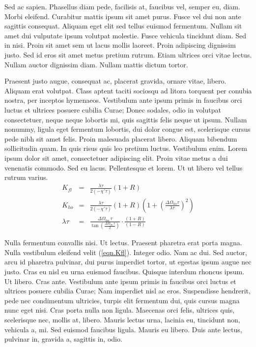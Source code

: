 \documentclass[article,colorback,accentcolor=tud4c]{tudreport}
\newif\ifTUDmargin\TUDmarginfalse
\begin{document}
    Sed ac sapien. Phasellus diam pede, facilisis at, faucibus vel, semper eu, diam. Morbi eleifend. Curabitur mattis ipsum sit amet purus. Fusce vel dui non ante sagittis consequat. Aliquam eget elit sed tellus euismod fermentum. Nullam sit amet dui vulputate ipsum volutpat molestie. Fusce vehicula tincidunt diam. Sed in nisi. Proin sit amet sem ut lacus mollis laoreet. Proin adipiscing dignissim justo. Sed id eros sit amet metus pretium rutrum. Etiam ultrices orci vitae lectus. Nullam auctor dignissim diam. Nullam mattis dictum tortor.

    Praesent justo augue, consequat ac, placerat gravida, ornare vitae, libero. Aliquam erat volutpat. Class aptent taciti sociosqu ad litora torquent per conubia nostra, per inceptos hymenaeos. Vestibulum ante ipsum primis in faucibus orci luctus et ultrices posuere cubilia Curae; Donec sodales, odio in volutpat consectetuer, neque neque lobortis mi, quis sagittis felis neque ut ipsum. Nullam nonummy, ligula eget fermentum lobortis, dui dolor congue est, scelerisque cursus pede nibh sit amet felis. Proin malesuada placerat libero. Aliquam bibendum sollicitudin quam. In quis risus quis leo pretium luctus. Vestibulum enim. Lorem ipsum dolor sit amet, consectetuer adipiscing elit. Proin vitae metus a dui venenatis commodo. Sed eu lacus. Pellentesque et lorem. Ut ut libero vel tellus rutrum varius.
			\begin{eqnarray}
				K_{fl}&=&\frac{\lambda\tau}{2(-\chi'\tau)}(1+R)\label{eqn.Kfl}\\
				K_{ho}&=&\frac{\lambda\tau}{2(-\chi'\tau)}(1+R)
					\left(1+\left(\frac{\Delta\Omega_{ho}\tau}{\lambda\tau}\right)^2\right)
					\label{eqn.Kho}\\
				\lambda\tau&=&
					\frac{\Delta\Omega_{ho}\,\tau}{\tan\left(\frac{\Delta\Omega_{ho}\,\tau}{2}
					\right)}\cdot\frac{(1+R)}{(1-R)}\label{eqn.lambda}
			\end{eqnarray}

    Nulla fermentum convallis nisi.%
    \ifTUDmargin%
      \marginpar{Nulla fermentum convallis nisi. Ut lectus. Praesent pharetra erat porta magna.}%
    \fi%
    Ut lectus. Praesent pharetra erat porta magna. Nulla vestibulum eleifend velit (\ref{eqn.Kfl}). Integer odio. Nam ac dui. Sed auctor, arcu id pharetra pulvinar, dui purus imperdiet tortor, ut egestas ipsum augue nec justo. Cras eu nisl eu urna euismod faucibus. Quisque interdum rhoncus ipsum. Ut libero. Cras ante. Vestibulum ante ipsum primis in faucibus orci luctus et ultrices posuere cubilia Curae; Nam imperdiet nisl ac eros. Suspendisse hendrerit, pede nec condimentum ultricies, turpis elit fermentum dui, quis cursus magna nunc eget nisi. Cras porta nulla non ligula. Maecenas orci felis, ultrices quis, scelerisque nec, mollis at, libero. Mauris lectus urna, lacinia eu, tincidunt non, vehicula a, mi. Sed euismod faucibus ligula. Mauris eu libero. Duis ante lectus, pulvinar in, gravida a, sagittis in, odio.
    
\end{document}
